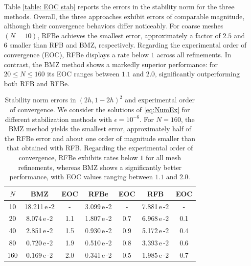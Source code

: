 \documentclass{article}
\newcommand{\delete}[1]{{\color{lightgray}#1}}
\begin{document}
Table \ref{table: EOC stab} reports the errors in the stability norm for the three methods.
Overall, the three approaches exhibit errors of comparable magnitude, although their convergence behaviors differ noticeably. For coarse meshes $(N=10)$, RFBe achieves the smallest error, approximately a factor of $2.5$ and $6$ smaller than RFB and BMZ, respectively.
Regarding the experimental order of convergence (EOC), RFBe displays a rate below $1$ across all refinements. In contrast, the BMZ method shows a markedly superior performance: for $20\le N\le 160$ its EOC ranges between $1.1$ and $2.0$, significantly outperforming both RFB and RFBe. 

\begin{table}[ht]
\centering
\begin{tabular}{|c|c|c|c|c|c|c|}
\hline
$N$ & BMZ & EOC & RFBe & EOC & RFB & EOC \\
\hline
10  & 18.211\,e\,-2 &    -    & 3.099\,e\,-2&   -  & 7.881\,e\,-2 &  -  \\
20  &  8.074\,e\,-2 &   1.1   & 1.807\,e\,-2&  0.7 & 6.968\,e\,-2 & 0.1 \\
40  &  2.851\,e\,-2 &   1.5   & 0.930\,e\,-2&  0.9 & 5.172\,e\,-2 & 0.4 \\
80  &  0.720\,e\,-2 &   1.9   & 0.510\,e\,-2&  0.8 & 3.393\,e\,-2 & 0.6 \\
160 &  0.169\,e\,-2 &   2.0   & 0.341\,e\,-2&  0.5 & 1.985\,e\,-2 & 0.7 \\
\hline
\end{tabular}
\caption{\small \label{table: EOC  stab} Stability norm errors in $(2h,1-2h)^2$ and experimental order of convergence. We consider the solutions of \eqref{eq:NumEx} for different stabilization methods with ${\epsilon=10^{-6}}$.
For $N=160$, the BMZ method yields the smallest error, approximately half of the RFBe error and about one order of magnitude smaller than that obtained with RFB. Regarding the experimental order of convergence, RFBe exhibits rates below $1$ for all mesh refinements, whereas BMZ shows a significantly better performance, with EOC values ranging between $1.1$ and $2.0$. }
\end{table}

\end{document}

